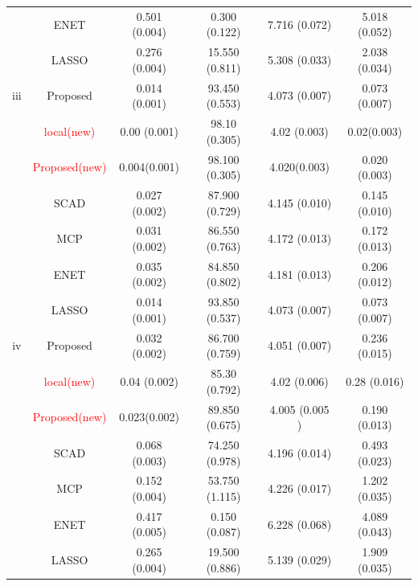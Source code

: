 \documentclass[12pt]{article}
\begin{document}
\begin{table}[H]
\begin{tabular}{cc|c|c|c|c}
  &ENET & 0.501 (0.004) & 0.300 (0.122) & 7.716 (0.072) & 5.018 (0.052) \\ 
  &LASSO & 0.276 (0.004) & 15.550 (0.811) & 5.308 (0.033) & 2.038 (0.034) \\ 
    \hline
    iii&Proposed&0.014 (0.001) & 93.450 (0.553) & 4.073 (0.007) & 0.073 (0.007)\\
    &\textcolor{red}{local(new)}& 0.00  (0.001)  & 98.10  (0.305) & 4.02  (0.003)& 0.02(0.003)\\
    &\textcolor{red}{Proposed(new)} & 0.004(0.001)& 98.100 (0.305) & 4.020(0.003) & 0.020 (0.003) \\ 
&SCAD & 0.027 (0.002) & 87.900 (0.729) & 4.145 (0.010) & 0.145 (0.010) \\ 
  &MCP & 0.031 (0.002) & 86.550 (0.763) & 4.172 (0.013) & 0.172 (0.013) \\ 
  &ENET & 0.035 (0.002) & 84.850 (0.802) & 4.181 (0.013) & 0.206 (0.012) \\ 
  &LASSO & 0.014 (0.001) & 93.850 (0.537) & 4.073 (0.007) & 0.073 (0.007) \\ 
    \hline
    iv&Proposed&0.032 (0.002) & 86.700 (0.759) & 4.051 (0.007) & 0.236 (0.015) \\
    &\textcolor{red}{local(new)}& 0.04  (0.002)  & 85.30  (0.792) & 4.02  (0.006) & 0.28  (0.016) \\ 
     &\textcolor{red}{Proposed(new)}& 0.023(0.002)& 89.850 (0.675) & 4.005  (0.005 )& 0.190 (0.013) \\ 
&SCAD & 0.068 (0.003) & 74.250 (0.978) & 4.196 (0.014) & 0.493 (0.023) \\ 
  &MCP & 0.152 (0.004) & 53.750 (1.115) & 4.226 (0.017) & 1.202 (0.035) \\ 
  &ENET & 0.417 (0.005) & 0.150 (0.087) & 6.228 (0.068) & 4.089 (0.043) \\ 
  &LASSO & 0.265 (0.004) & 19.500 (0.886) & 5.139 (0.029) & 1.909 (0.035) \\ 
    \hline
  \end{tabular}
\end{table}
\end{document}
